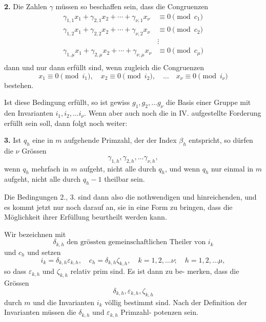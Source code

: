 \documentclass[12pt,a4paper]{article}
\begin{document}
\medskip
\noindent\textbf{2.} Die Zahlen $\gamma$ müssen so beschaffen sein, dass
die Congruenzen
\begin{equation}\label{eq:k21-9}
\begin{aligned}
\gamma_{1,1} x_1 + \gamma_{2,1} x_2 + \cdots + \gamma_{\nu,1} x_\nu &\equiv 0 \pmod{c_1}\\
\gamma_{1,2} x_1 + \gamma_{2,2} x_2 + \cdots + \gamma_{\nu,2} x_\nu &\equiv 0 \pmod{c_2}\\
&\vdots\\
\gamma_{1,\mu} x_1 + \gamma_{2,\mu} x_2 + \cdots + \gamma_{\nu,\mu} x_\nu &\equiv 0 \pmod{c_\mu}\\
\end{aligned}
\end{equation}
dann und nur dann erfüllt sind, wenn zugleich
die Congruenzen
\begin{equation}\label{eq:k21-10}
x_1 \equiv 0 \pmod{i_1},\quad x_2 \equiv 0 \pmod{i_2},\quad \ldots\quad x_\nu \equiv 0 \pmod{i_\nu}
\end{equation}
bestehen.

\newpage

\newpage
Ist diese Bedingung erfüllt, so ist gewiss $g_1, g_2, \ldots g_\nu$ die
Basis einer Gruppe mit den Invarianten $i_1, i_2, \ldots i_\nu$. Wenn aber
auch noch die in IV. aufgestellte Forderung erfüllt sein soll,
dann folgt noch weiter:

\medskip
\noindent\textbf{3.} Ist $q_h$ eine in $m$ aufgehende Primzahl, der der
Index $\beta_h$ entspricht, so dürfen die $\nu$ Grössen
\[\gamma_{1,h}, \gamma_{2,h}, \ldots \gamma_{\nu,h},\]
wenn $q_h$ mehrfach in $m$ aufgeht, nicht alle
durch $q_h$, und wenn $q_h$ nur einmal in $m$ aufgeht,
nicht alle durch $q_h - 1$ theilbar sein.

Die Bedingungen 2., 3. sind dann also die nothwendigen
und hinreichenden, und es kommt jetzt nur noch darauf an, sie
in eine Form zu bringen, dass die Möglichkeit ihrer Erfüllung
beurtheilt werden kann.

Wir bezeichnen mit
\[\delta_{k,h} \text{ den grössten gemeinschaftlichen Theiler von } i_k\]
und $c_h$ und setzen
\begin{equation}\label{eq:k21-11}
i_k = \delta_{k,h} \varepsilon_{k,h}, \quad c_h = \delta_{k,h} \zeta_{k,h}, \quad
k=1,2,\ldots\nu;\quad h=1,2,\ldots\mu,
\end{equation}
so dass $\varepsilon_{k,h}$ und $\zeta_{k,h}$ relativ prim sind. Es ist dann zu be-
merken, dass die Grössen
\[\delta_{k,h}, \varepsilon_{k,h}, \zeta_{k,h}\]
durch $m$ und die Invarianten $i_k$ völlig bestimmt sind. Nach der
Definition der Invarianten müssen die $\delta_{k,h}$ und $\varepsilon_{k,h}$ Primzahl-
potenzen sein.
\end{document}
